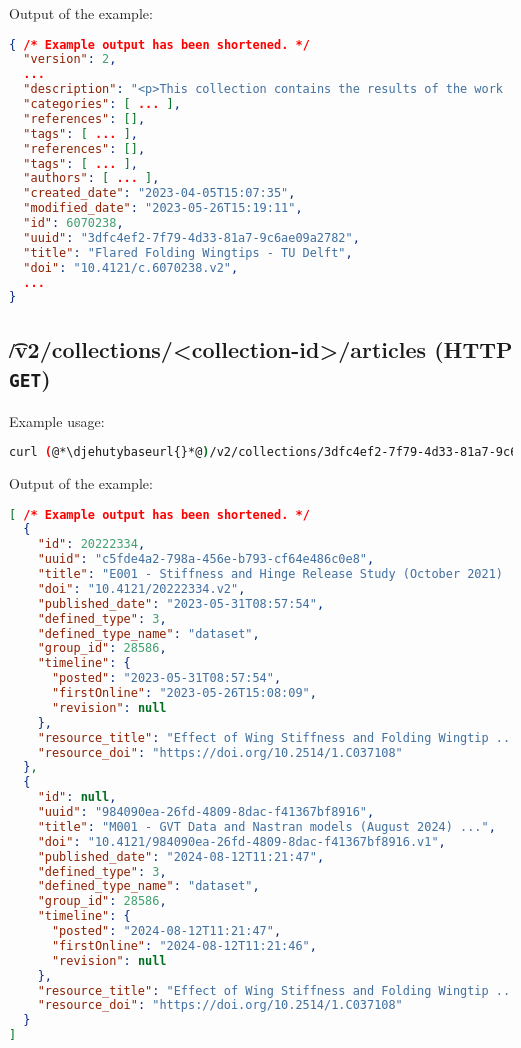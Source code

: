   Output of the example:
\begin{lstlisting}[language=JSON]
{ /* Example output has been shortened. */
  "version": 2,
  ...
  "description": "<p>This collection contains the results of the work ...",
  "categories": [ ... ],
  "references": [],
  "tags": [ ... ],
  "references": [],
  "tags": [ ... ],
  "authors": [ ... ],
  "created_date": "2023-04-05T15:07:35",
  "modified_date": "2023-05-26T15:19:11",
  "id": 6070238,
  "uuid": "3dfc4ef2-7f79-4d33-81a7-9c6ae09a2782",
  "title": "Flared Folding Wingtips - TU Delft",
  "doi": "10.4121/c.6070238.v2",
  ...
}
\end{lstlisting}

\subsection{\t{/v2/collections/<collection-id>/articles} (HTTP \texttt{GET})}

  Example usage:
\begin{lstlisting}[language=bash]
curl (@*\djehutybaseurl{}*@)/v2/collections/3dfc4ef2-7f79-4d33-81a7-9c6ae09a2782/articles | jq
\end{lstlisting}

  Output of the example:
\begin{lstlisting}[language=JSON]
[ /* Example output has been shortened. */
  {
    "id": 20222334,
    "uuid": "c5fde4a2-798a-456e-b793-cf64e486c0e8",
    "title": "E001 - Stiffness and Hinge Release Study (October 2021) ...",
    "doi": "10.4121/20222334.v2",
    "published_date": "2023-05-31T08:57:54",
    "defined_type": 3,
    "defined_type_name": "dataset",
    "group_id": 28586,
    "timeline": {
      "posted": "2023-05-31T08:57:54",
      "firstOnline": "2023-05-26T15:08:09",
      "revision": null
    },
    "resource_title": "Effect of Wing Stiffness and Folding Wingtip ...",
    "resource_doi": "https://doi.org/10.2514/1.C037108"
  },
  {
    "id": null,
    "uuid": "984090ea-26fd-4809-8dac-f41367bf8916",
    "title": "M001 - GVT Data and Nastran models (August 2024) ...",
    "doi": "10.4121/984090ea-26fd-4809-8dac-f41367bf8916.v1",
    "published_date": "2024-08-12T11:21:47",
    "defined_type": 3,
    "defined_type_name": "dataset",
    "group_id": 28586,
    "timeline": {
      "posted": "2024-08-12T11:21:47",
      "firstOnline": "2024-08-12T11:21:46",
      "revision": null
    },
    "resource_title": "Effect of Wing Stiffness and Folding Wingtip ...",
    "resource_doi": "https://doi.org/10.2514/1.C037108"
  }
]
\end{lstlisting}

